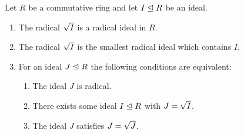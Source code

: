 \begin{lemma}
  Let $R$ be a commutative ring and let $I \trianglelefteq R$ be an ideal. 
  \begin{enumerate}
    \item
      \label{enumerate: radicals are radical}
      The radical $\sqrt{I}$ is a radical ideal in $R$.
    \item
      The radical $\sqrt{I}$ is the smallest radical ideal which contains $I$.
    \item
      For an ideal $J \trianglelefteq R$ the following conditions are equivalent:
      \begin{enumerate}
        \item
          \label{enumerate: J is radical}
          The ideal $J$ is radical.
        \item
          \label{enumerate: J is some radical}
          There exists some ideal $I \trianglelefteq R$ with $J = \sqrt{I}$.
        \item
          \label{enumerate: J is its own radical}
          The ideal $J$ satisfies $J = \sqrt{J}$.
      \end{enumerate}
  \end{enumerate}
\end{lemma}

